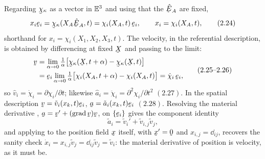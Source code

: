 Regarding $\bchi_\kappa$ as a vector in $\mathbb{E}^{3}$ and using that the $\hbE_A$ are
fixed,
\begin{equation}
   x_i\be_i=\bchi_\kappa(X_A\hbE_A,t)=\chi_i(X_A,t)\,\be_i,\qquad
   x_i=\chi_i(X_A,t), \tag{2.24}\label{eq:2.24}
\end{equation}
shorthand for $x_i=\chi_i(X_1,X_2,X_3,t)$. The velocity, in the referential
description, is obtained by differencing at fixed $\bX$ and passing to the
limit:
\begin{equation}
\begin{aligned}
   \bv&=\lim_{\alpha\to0}\tfrac1\alpha\big[\bchi_\kappa(\bX,t+\alpha)
      -\bchi_\kappa(\bX,t)\big]\\
   &=\be_i\lim_{\alpha\to0}\tfrac1\alpha\big[\chi_i(X_A,t+\alpha)
      -\chi_i(X_A,t)\big]=\dot\chi_i\,\be_i,
\end{aligned}\tag{2.25--2.26}\label{eq:2.25}
\end{equation}
so $\hat v_i=\dot\chi_i=\partial\chi_i/\partial t$; likewise
$\hat a_i=\ddot\chi_i=\partial^2\chi_i/\partial t^2$ $(2.27)$. In the spatial
description $\bv=\tilde v_i(x_k,t)\be_i$, $\ba=\tilde a_i(x_k,t)\be_i$
$(2.28)$. Resolving the material derivative , $\ba=\bv'+(\grad\bv)\bv$,
on $\{\be_i\}$ gives the component identity
\begin{equation}
   \tilde a_i=\tilde v_i'+\tilde v_{i,j}\tilde v_j, \tag{2.29}\label{eq:2.29}
\end{equation}
and applying  to the position field $\bx$ itself, with $\bx'=\bze$
and $x_{i,j}=\dd_{ij}$, recovers the sanity check $\dot x_i=x_{i,j}\tilde v_j
=\dd_{ij}\tilde v_j=\tilde v_i$: the material derivative of position is
velocity, as it must be.

